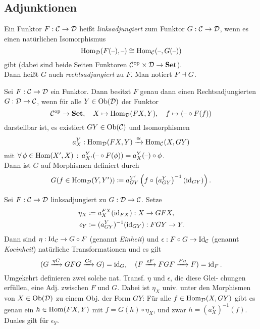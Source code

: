 \documentclass{cheat-sheet}
\begin{document}
\subsection{Adjunktionen}

\begin{defn}
  Ein Funktor $F : \mathcal{C} \to \mathcal{D}$ heißt \emph{linksadjungiert} zum Funktor $G : \mathcal{C} \to \mathcal{D}$, wenn es einen natürlichen Isomorphismus
  \[
    \operatorname{Hom}_{\mathcal{D}}(F(\text{--}), \text{--}) \cong \operatorname{Hom}_{\mathcal{C}}(\text{--}, G(\text{--}))
  \]
  gibt (dabei sind beide Seiten Funktoren $\mathcal{C}^{\mathrm{op}} \times \mathcal{D} \to \mathbf{Set}$). \\
  Dann heißt $G$ auch \emph{rechtsadjungiert} zu $F$. Man notiert $F \dashv G$.
\end{defn}

\begin{bem}
  Sei $F : \mathcal{C} \to \mathcal{D}$ ein Funktor.
  Dann besitzt $F$ genau dann einen Rechtsadjungierten $G : \mathcal{D} \to \mathcal{C}$, wenn für alle $Y \in \operatorname{Ob}(\mathcal{D})$ der Funktor
  \[
    \mathcal{C}^{\mathrm{op}} \to \mathbf{Set}, \quad
    X \mapsto \operatorname{Hom}_{\mathcal{D}}(FX, Y), \quad
    f \mapsto (\text{--} \circ F(f))
  \]
  darstellbar ist, \dh{} es existiert $GY \in \operatorname{Ob}(\mathcal{C})$ und Isomorphismen
  \[ a^Y_X : \operatorname{Hom}_{\mathcal{D}}(FX, Y) \xrightarrow{\cong} \operatorname{Hom}_{\mathcal{C}}(X, GY) \]
  mit $\forall \, {\phi \in \operatorname{Hom}(X', X)} \,:\, a^Y_{X'}(\text{--} \circ F(\phi)) = a^Y_X(\text{--}) \circ \phi$. \\
  Dann ist $G$ auf Morphismen definiert durch
  \[ G(f \in \operatorname{Hom}_{\mathcal{D}}(Y, Y')) \coloneqq a^{Y'}_{GY} \left( f \circ \left( a^Y_{GY} \right)^{-1} (\operatorname{id}_{GY}) \right). \]
\end{bem}

\begin{bem}
  Sei $F : \mathcal{C} \to \mathcal{D}$ linksadjungiert zu $G : \mathcal{D} \to \mathcal{C}$. Setze
  \begin{align*}
    \eta_X & \coloneqq a_X^{FX}(\operatorname{id}_{FX}) : X \to GFX, \\
    \epsilon_Y & \coloneqq (a_{GY}^Y)^{-1}(\operatorname{id}_{GY}) : FGY \to Y.
  \end{align*}
  Dann sind $\eta : \operatorname{Id}_{\mathcal{C}} \to G \circ F$ (genannt \emph{Einheit}) und $\epsilon : F \circ G \to \operatorname{Id}_{\mathcal{C}}$ (genannt \emph{Koeinheit}) natürliche Transformationen und es gilt
  \[
    (G \xrightarrow{\eta G} GFG \xrightarrow{G \epsilon} G) = \operatorname{id}_G, \quad
    (F \xrightarrow{\epsilon F} FGF \xrightarrow{F \eta} F) = \operatorname{id}_F.
  \]
  Umgekehrt definieren zwei solche nat. Transf. $\eta$ und $\epsilon$, die diese Glei- chungen erfüllen, eine Adj. zwischen $F$ und $G$.
  Dabei ist $\eta_X$ univ. unter den Morphismen von $X \in \operatorname{Ob}(\mathcal{D})$ zu einem Obj. der Form $GY$:
  Für alle $f \in \operatorname{Hom}_{\mathcal{D}}(X, GY)$ gibt es genau ein $h \in \operatorname{Hom}(FX, Y)$ mit $f = G(h) \circ \eta_X$, und zwar $h = (a_X^Y)^{-1}(f)$. Duales gilt für $\epsilon_Y$.
\end{bem}
\end{document}
